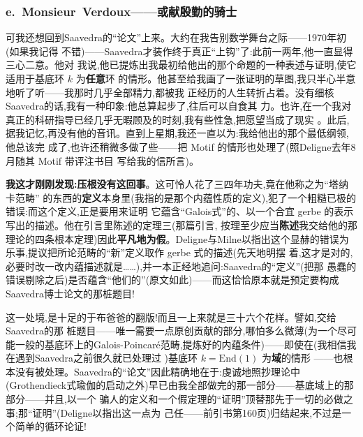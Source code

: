 \subsubsection{e.\ Monsieur~Verdoux——或献殷勤的骑士}


可我还想回到Saavedra的“论文”上来。大约在我告别数学舞台之际——1970年初(如果我记得
不错)——Saavedra才装作终于真正“上钩”了:此前一两年,他一直显得三心二意。他对
我说,他已提炼出我最初给他出的那个命题的一种表述与证明,使它适用于基底环 $k$ 为\textbf{任意}环
的情形。他甚至给我画了一张证明的草图,我只半心半意地听了听——我那时几乎全部精力,都被我
正经历的人生转折占着。没有细核Saavedra的话,我有一种印象:他总算起步了,往后可以自食其
力。也许,在一个我对真正的科研指导已经几乎无暇顾及的时刻,我有些性急,把愿望当成了现实
。此后,据我记忆,再没有他的音讯。直到上星期,我还一直以为:我给他出的那个最低纲领,他总该完
成了,也许还稍微\dmark{}多做了些——把 Motif 的情形也处理了(照Deligne去年8月随其 Motif 带评注书目
写给我的信所言)。

\textbf{我这才刚刚发现:压根没有这回事}。这可怜人花了三四年功夫,竟在他称之为“塔纳卡范畴”
的东西的\textbf{定义}本身里(我指的是那个内蕴性质的定义),犯了一个粗糙已极的错误:而这个定义,正是要用来证明
它蕴含“Galois式”的、以一个合宜 gerbe 的表示写出的描述。他在引言里陈述的定理三(那篇引言,
按理至少应当\textbf{陈述}我交给他的那理论的四条根本定理)因此\textbf{平凡地为假}。Deligne与Milne以指出这个显赫的错误为乐事,提议把所论范畴的“新”定义取作 gerbe 式的描述(先天地明摆
着,这才是对的,必要时改一改内蕴描述就是……),并一本正经地追问:Saavedra的“定义”(把那
愚蠢的错误剔除之后)是否蕴含“他们的”(原文如此)——而这恰恰原本就是预定要构成Saavedra博士论文的那桩题目!

这一处境,是十足的于布爸爸的翻版!而且一上来就是三十六个花样。譬如,交给Saavedra的那
桩题目——唯一需要一点原创贡献的部分,哪怕多么微薄(为一个尽可能一般的基底环上的Galois-Poincaré范畴,提炼好的内蕴条件)——即使在(我相信我在遇到Saavedra之前很久就已处理过
)基底环\dmark{} $k=\mathrm{End}(1)$ 为\textbf{域}的情形
——也根本没有被处理。Saavedra的“论文”因此精确地在于:虔诚地照抄理论中(Grothendieck式瑜伽的启动之外)早已由我全部做完的那一部分——基底域上的那部分——并且,以一个
骗人的定义和一个假定理的“证明”顶替那先于一切的必做之事;那“证明”(Deligne以指出这一点为
己任——前引书第160页)归结起来,不过是一个简单的循环论证!

